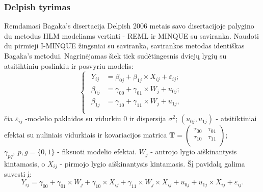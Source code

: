 \documentclass[11pt,a4paper]{article}
\begin{document}
\subsubsection{Delpish tyrimas}\label{subsubsec:dminque}

\indent Remdamasi Bagaka's disertacija Delpish 2006 metais savo disertacijoje\cite{delpish} palygino du metodus HLM modeliams vertinti - REML ir MINQUE su saviranka. Naudoti du pirmieji I-MINQUE žingsniai su saviranka, savirankos metodas identiškas Bagaka's metodui. Nagrinėjamas šiek tiek sudėtingesnis dviejų lygių su atsitiktiniu poslinkiu ir posvyriu modelis:
\begin{equation*} \label{eq:2lvldelpish}
\left\{
\begin{array}{l}
\begin{split}
Y_{ij} &= \beta_{0j}+ \beta_{1j}\times X_{ij}+\varepsilon_{ij}; \\
\beta_{0j} &= \gamma_{00} +\gamma_{01}\times W_{j}+u_{0j};\\
\beta_{1j} &= \gamma_{10} +\gamma_{11}\times W_{j}+u_{1j},\\
\end{split}
\end{array} \right.
\end{equation*}
čia $\varepsilon_{ij}$ -modelio paklaidos su vidurkiu $0$ ir dispersija $\sigma^2$; $\left(u_{0j}, u_{1j}\right)$ - atsitiktiniai efektai su nuliniais vidurkiais ir kovariacijos matrica $\mathbf{T}=\begin{pmatrix}
\tau_{00} & \tau_{01} \\
\tau_{10} & \tau_{11} \\
\end{pmatrix}$; $\gamma_{pq},\ p,g = \{0,1\}$ - fiksuoti modelio efektai. $W_j$ - antrojo lygio aiškinantysis kintamasis, o $X_{ij}$ - pirmojo lygio aiškinantysis kintamasis. Šį pavidalą galima suvesti į:
\begin{equation*} \label{eq:deq}
Y_{ij} = \gamma_{00} +\gamma_{01}\times W_{j}+ \gamma_{10}\times X_{ij}+\gamma_{11}\times W_{j}\times X_{ij}+u_{0j}+u_{1j}\times X_{ij}+\varepsilon_{ij}.
\end{equation*}
\end{document}
